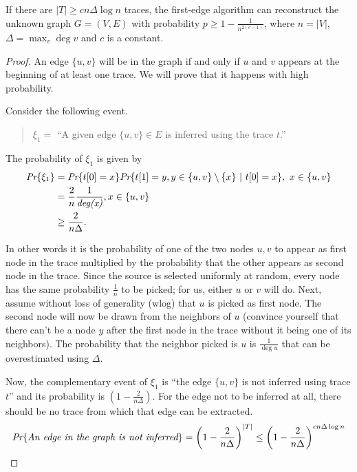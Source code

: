  \begin{thm}
 	 If there are $|T| \geq cn\Delta\log n$ traces, the first-edge algorithm can reconstruct the unknown graph $G=(V, E)$ with probability $p \geq 1 - \frac{1}{n^{2(c-1)}}$, where $n = |V|$, $\Delta = \max_v \deg{v}$ and $c$ is a constant.
 \end{thm}
\begin{proof}
	An edge $\{u, v\}$ will be in the graph if and only if $u$ and $v$ appears at the beginning of at least one trace. We will prove that it happens with high probability.
	
	Consider the following event.
	\begin{quotation}
		$\xi_1 =$ ``A given edge $\{u, v\} \in E$ is inferred using the trace $t$.''
	\end{quotation}
	
	The probability of $\xi_1$ is given by
	\begin{align}
	\emph{Pr}\{\xi_1\} &= \emph{Pr}\{t[0] = x\}\emph{Pr}\{t[1] = y, y\in \{u, v\}\setminus\{x\}\ |\ t[0] = x\},\  x\in \{u, v\}\\
	&= \frac{2}{n}\frac{1}{\deg{x}}, x \in \{u, v\}\\
	&\geq \frac{2}{n\Delta}.
	\end{align}
	
	In other words it is the probability of one of the two nodes $u, v$ to appear as first node in the trace multiplied by the probability that the other appears as second node in the trace. Since the source is selected uniformly at random, every node has the same probability $\frac{1}{n}$ to be picked; for us, either $u$ or $v$ will do. Next, assume without loss of generality (wlog) that $u$ is picked as first node. The second node will now be drawn from the neighbors of $u$ (convince yourself that there can't be a node $y$ after the first node in the trace without it being one of its neighbors). The probability that the neighbor picked is $u$ is $\frac{1}{\deg{u}}$ that can be overestimated using $\Delta$.
	
	Now, the complementary event of $\xi_1$ is ``the edge $\{u,v\}$ is not inferred using trace $t$'' and its probability is $(1 - \frac{2}{n\Delta})$. For the edge not to be inferred at all, there should be no trace from which that edge can be extracted.
	\begin{equation}
	\pr{\emph{An edge in the graph is not inferred}} = \left(1- \frac{2}{n\Delta}\right)^{|T|} \leq \left(1- \frac{2}{n\Delta}\right)^{cn\Delta\log n} 
	\end{equation}
	

\end{proof}
